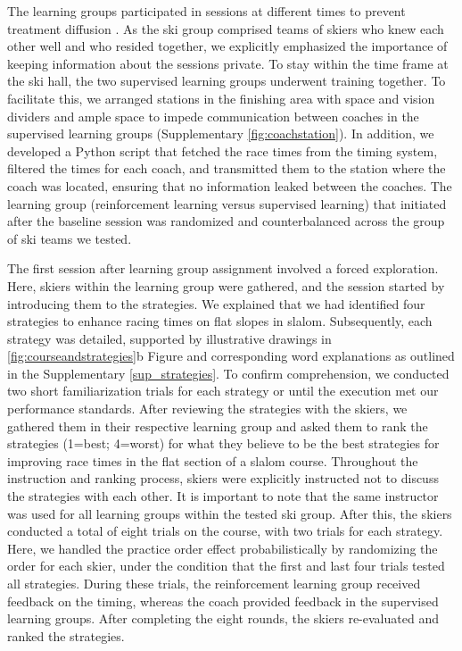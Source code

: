 \documentclass[pdflatex,sn-nature]{sn-jnl}%
\theoremstyle{thmstyleone}%
\theoremstyle{thmstyletwo}%
\theoremstyle{thmstylethree}%
\begin{document}
The learning groups participated in sessions at different times to prevent treatment diffusion \cite{maxwell_designing_2017}. As the ski group comprised teams of skiers who knew each other well and who resided together, we explicitly emphasized the importance of keeping information about the sessions private. To stay within the time frame at the ski hall, the two supervised learning groups underwent training together. To facilitate this, we arranged stations in the finishing area with space and vision dividers and ample space to impede communication between coaches in the supervised learning groups (Supplementary \ref{fig:coachstation}). In addition, we developed a Python script that fetched the race times from the timing system, filtered the times for each coach, and transmitted them to the station where the coach was located, ensuring that no information leaked between the coaches. The learning group (reinforcement learning versus supervised learning) that initiated after the baseline session was randomized and counterbalanced across the group of ski teams we tested. 

The first session after learning group assignment involved a forced exploration. Here, skiers within the learning group were gathered, and the session started by introducing them to the strategies. We explained that we had identified four strategies to enhance racing times on flat slopes in slalom. Subsequently, each strategy was detailed, supported by illustrative drawings in \ref{fig:courseandstrategies}b Figure and corresponding word explanations as outlined in the Supplementary \ref{sup_strategies}. To confirm comprehension, we conducted two short familiarization trials for each strategy or until the execution met our performance standards. After reviewing the strategies with the skiers, we gathered them in their respective learning group and asked them to rank the strategies (1=best; 4=worst) for what they believe to be the best strategies for improving race times in the flat section of a slalom course. Throughout the instruction and ranking process, skiers were explicitly instructed not to discuss the strategies with each other. It is important to note that the same instructor was used for all learning groups within the tested ski group. After this, the skiers conducted a total of eight trials on the course, with two trials for each strategy. Here, we handled the practice order effect probabilistically by randomizing the order for each skier, under the condition that the first and last four trials tested all strategies. During these trials, the reinforcement learning group received feedback on the timing, whereas the coach provided feedback in the supervised learning groups. After completing the eight rounds, the skiers re-evaluated and ranked the strategies.
\end{document}
